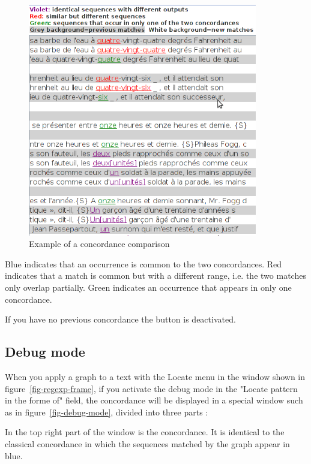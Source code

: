 \begin{figure}[h]
\begin{center}
\includegraphics[width=10cm]{resources/img/fig6-33.png}
\caption{Example of a concordance comparison\label{fig-concordiff}}
\end{center}
\end{figure}

\bigskip
\noindent Blue indicates that an occurrence is common to the two concordances. Red indicates that a match is common but
with a different range, i.e. the two matches only overlap partially. Green indicates an
occurrence that appears in only one concordance.

\bigskip
\noindent If you have no previous concordance the button is deactivated.

\subsection{Debug mode}
\label{section-debug-mode}
When  you apply a graph to a text with the Locate menu 
in the window shown in figure~\ref{fig-regexp-frame}, 
if you activate the debug mode in the "Locate pattern in the forme of" field,
the concordance will be displayed in a special window such as in figure~\ref{fig-debug-mode}, divided into three parts :

\medskip 
\indent In the top right part of the window is the concordance. It is identical to the classical concordance in which the sequences matched by the graph appear in blue.

